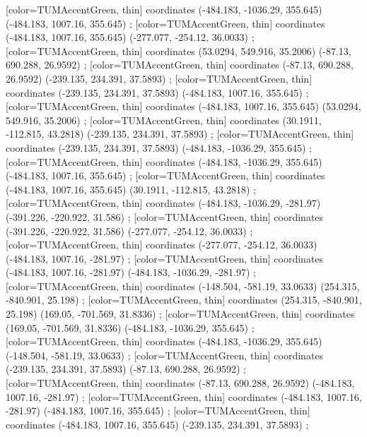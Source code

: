         [color=TUMAccentGreen, thin] coordinates { (-484.183, -1036.29, 355.645) (-484.183, 1007.16, 355.645) };
        [color=TUMAccentGreen, thin] coordinates { (-484.183, 1007.16, 355.645) (-277.077, -254.12, 36.0033) };
        [color=TUMAccentGreen, thin] coordinates { (53.0294, 549.916, 35.2006) (-87.13, 690.288, 26.9592) };
        [color=TUMAccentGreen, thin] coordinates { (-87.13, 690.288, 26.9592) (-239.135, 234.391, 37.5893) };
        [color=TUMAccentGreen, thin] coordinates { (-239.135, 234.391, 37.5893) (-484.183, 1007.16, 355.645) };
        [color=TUMAccentGreen, thin] coordinates { (-484.183, 1007.16, 355.645) (53.0294, 549.916, 35.2006) };
        [color=TUMAccentGreen, thin] coordinates { (30.1911, -112.815, 43.2818) (-239.135, 234.391, 37.5893) };
        [color=TUMAccentGreen, thin] coordinates { (-239.135, 234.391, 37.5893) (-484.183, -1036.29, 355.645) };
        [color=TUMAccentGreen, thin] coordinates { (-484.183, -1036.29, 355.645) (-484.183, 1007.16, 355.645) };
        [color=TUMAccentGreen, thin] coordinates { (-484.183, 1007.16, 355.645) (30.1911, -112.815, 43.2818) };
        [color=TUMAccentGreen, thin] coordinates { (-484.183, -1036.29, -281.97) (-391.226, -220.922, 31.586) };
        [color=TUMAccentGreen, thin] coordinates { (-391.226, -220.922, 31.586) (-277.077, -254.12, 36.0033) };
        [color=TUMAccentGreen, thin] coordinates { (-277.077, -254.12, 36.0033) (-484.183, 1007.16, -281.97) };
        [color=TUMAccentGreen, thin] coordinates { (-484.183, 1007.16, -281.97) (-484.183, -1036.29, -281.97) };
        [color=TUMAccentGreen, thin] coordinates { (-148.504, -581.19, 33.0633) (254.315, -840.901, 25.198) };
        [color=TUMAccentGreen, thin] coordinates { (254.315, -840.901, 25.198) (169.05, -701.569, 31.8336) };
        [color=TUMAccentGreen, thin] coordinates { (169.05, -701.569, 31.8336) (-484.183, -1036.29, 355.645) };
        [color=TUMAccentGreen, thin] coordinates { (-484.183, -1036.29, 355.645) (-148.504, -581.19, 33.0633) };
        [color=TUMAccentGreen, thin] coordinates { (-239.135, 234.391, 37.5893) (-87.13, 690.288, 26.9592) };
        [color=TUMAccentGreen, thin] coordinates { (-87.13, 690.288, 26.9592) (-484.183, 1007.16, -281.97) };
        [color=TUMAccentGreen, thin] coordinates { (-484.183, 1007.16, -281.97) (-484.183, 1007.16, 355.645) };
        [color=TUMAccentGreen, thin] coordinates { (-484.183, 1007.16, 355.645) (-239.135, 234.391, 37.5893) };
